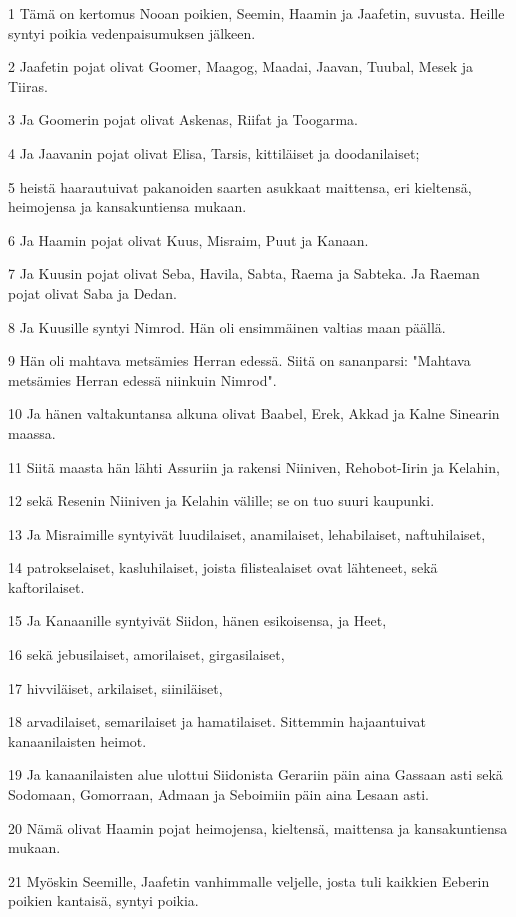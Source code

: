 \par 1 Tämä on kertomus Nooan poikien, Seemin, Haamin ja Jaafetin, suvusta. Heille syntyi poikia vedenpaisumuksen jälkeen.
\par 2 Jaafetin pojat olivat Goomer, Maagog, Maadai, Jaavan, Tuubal, Mesek ja Tiiras.
\par 3 Ja Goomerin pojat olivat Askenas, Riifat ja Toogarma.
\par 4 Ja Jaavanin pojat olivat Elisa, Tarsis, kittiläiset ja doodanilaiset;
\par 5 heistä haarautuivat pakanoiden saarten asukkaat maittensa, eri kieltensä, heimojensa ja kansakuntiensa mukaan.
\par 6 Ja Haamin pojat olivat Kuus, Misraim, Puut ja Kanaan.
\par 7 Ja Kuusin pojat olivat Seba, Havila, Sabta, Raema ja Sabteka. Ja Raeman pojat olivat Saba ja Dedan.
\par 8 Ja Kuusille syntyi Nimrod. Hän oli ensimmäinen valtias maan päällä.
\par 9 Hän oli mahtava metsämies Herran edessä. Siitä on sananparsi: "Mahtava metsämies Herran edessä niinkuin Nimrod".
\par 10 Ja hänen valtakuntansa alkuna olivat Baabel, Erek, Akkad ja Kalne Sinearin maassa.
\par 11 Siitä maasta hän lähti Assuriin ja rakensi Niiniven, Rehobot-Iirin ja Kelahin,
\par 12 sekä Resenin Niiniven ja Kelahin välille; se on tuo suuri kaupunki.
\par 13 Ja Misraimille syntyivät luudilaiset, anamilaiset, lehabilaiset, naftuhilaiset,
\par 14 patrokselaiset, kasluhilaiset, joista filistealaiset ovat lähteneet, sekä kaftorilaiset.
\par 15 Ja Kanaanille syntyivät Siidon, hänen esikoisensa, ja Heet,
\par 16 sekä jebusilaiset, amorilaiset, girgasilaiset,
\par 17 hivviläiset, arkilaiset, siiniläiset,
\par 18 arvadilaiset, semarilaiset ja hamatilaiset. Sittemmin hajaantuivat kanaanilaisten heimot.
\par 19 Ja kanaanilaisten alue ulottui Siidonista Gerariin päin aina Gassaan asti sekä Sodomaan, Gomorraan, Admaan ja Seboimiin päin aina Lesaan asti.
\par 20 Nämä olivat Haamin pojat heimojensa, kieltensä, maittensa ja kansakuntiensa mukaan.
\par 21 Myöskin Seemille, Jaafetin vanhimmalle veljelle, josta tuli kaikkien Eeberin poikien kantaisä, syntyi poikia.
